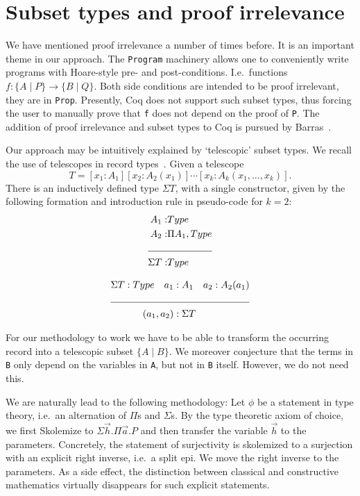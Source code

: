 \documentclass[a4paper,10pt,runningheads]{llncs}
\begin{document}
\section{Subset types and proof irrelevance}\label{PI}
We have mentioned proof irrelevance a number of times before. It is an important theme in our
approach. The \lstinline|Program| machinery allows one to conveniently write programs with Hoare-style
pre- and post-conditions. I.e.\ functions $f: \{ A \mid P \} \to \{ B \mid Q \}$. Both side
conditions
are intended to be proof irrelevant, they are in \lstinline|Prop|. Presently, Coq does not support such subset
types, thus forcing the user to manually prove that \lstinline|f| does not depend on the proof of \lstinline|P|.
The addition of proof irrelevance and subset types to Coq is pursued by
Barras~\cite{Barras:subset,Werner08}. 

Our approach may be intuitively explained by `telescopic' subset types. We recall the use of telescopes in record types~\cite{pollack2000dependently}. Given a telescope\[
T=[x_1:A_1][x_2:A_2(x_1)]\cdots[x_k:A_k(x_1,\ldots,x_k)].
\]
There is an inductively defined type $\Sigma T$, with a single constructor, given by the following 
formation and introduction rule in pseudo-code for $k=2$:
\begin{align*}
 A_1 :& Type\\
 A_2 :& \Pi A_1,Type\\
\cline{1-2}
\Sigma T :& Type
\end{align*}

\begin{align*}
 \Sigma T:Type\quad a_1 &:A_1 \quad a_2 : A_2(a_1)\\
\cline{1-3}
(a_1,a_2) &: \Sigma T
\end{align*}

For our methodology to work we have to be able to transform the occurring record into a telescopic
subset $\{ A \mid  B\}$. We moreover conjecture that the terms in \lstinline|B| only depend on the
variables in \lstinline|A|, but not in \lstinline|B| itself. However, we do not need this.

We are naturally lead to the following methodology: Let $\phi$ be a statement in type
theory, i.e.\ an alternation of $\Pi$s and $\Sigma$s. By the type theoretic axiom of choice, we first Skolemize to $\Sigma \overrightarrow{h}. \Pi \overrightarrow{a}. P$ and then transfer the variable $\overrightarrow{h}$ to the parameters. Concretely, the statement of surjectivity is skolemized to a surjection with an explicit right inverse, i.e.\ a split epi. We move the right inverse to the parameters. As a side effect, the distinction between classical and constructive mathematics virtually disappears for such explicit statements.
\end{document}
